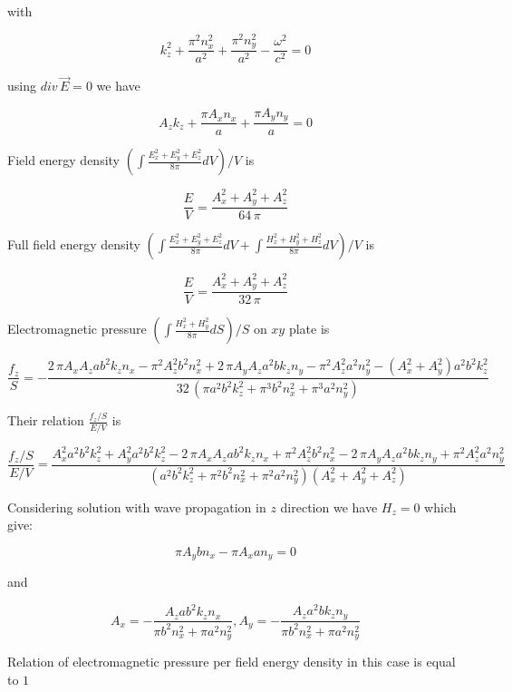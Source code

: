 \documentclass[11pt]{article}
\begin{document}
with

\[k_{z}^{2} + \frac{\pi^{2} n_{x}^{2}}{a^{2}} + \frac{\pi^{2} n_{y}^{2}}{a^{2}} - \frac{\omega^{2}}{c^{2}} = 0\]

using \(div\,\vec{E} = 0\) we have

\[A_{z} k_{z} + \frac{\pi A_{x} n_{x}}{a} + \frac{\pi A_{y} n_{y}}{a} = 0\]

Field energy density
\(\left(\int \frac{E_x^2+E_y^2+E_z^2}{8 \pi}dV\right)\big/{V}\) is

\[\frac{E}{V} = \frac{{A_{x}^{2} + A_{y}^{2} + A_{z}^{2}} }{64 \, \pi}\]

    Full field energy density
\(\left(\int \frac{E_x^2+E_y^2+E_z^2}{8 \pi}dV + \int \frac{H_x^2+H_y^2+H_z^2}{8 \pi}dV\right)\big/{V}\)
is

    \[\frac{E}{V} = \frac{{A_{x}^{2} + A_{y}^{2} + A_{z}^{2}}}{32 \, \pi}\]

    Electromagnetic pressure
\(\left({\int \frac {H_x^2+H_y^2}{8 \pi} dS}\right)\big/{S}\) on \(xy\)
plate is

    \[\frac{f_z}{S} = -\frac{2 \, \pi A_{x} A_{z} a b^{2} k_{z} n_{x} - \pi^{2} A_{z}^{2} b^{2} n_{x}^{2} + 2 \, \pi A_{y} A_{z} a^{2} b k_{z} n_{y} - \pi^{2} A_{z}^{2} a^{2} n_{y}^{2} - {\left(A_{x}^{2} + A_{y}^{2}\right)} a^{2} b^{2} k_{z}^{2}}{32 \, {\left(\pi a^{2} b^{2} k_{z}^{2} + \pi^{3} b^{2} n_{x}^{2} + \pi^{3} a^{2} n_{y}^{2}\right)}}\]

    Their relation \(\frac{f_z/S}{E/V}\) is

    \[\frac{f_z/S}{E/V} = \frac{A_{x}^{2} a^{2} b^{2} k_{z}^{2} + A_{y}^{2} a^{2} b^{2} k_{z}^{2} - 2 \, \pi A_{x} A_{z} a b^{2} k_{z} n_{x} + \pi^{2} A_{z}^{2} b^{2} n_{x}^{2} - 2 \, \pi A_{y} A_{z} a^{2} b k_{z} n_{y} + \pi^{2} A_{z}^{2} a^{2} n_{y}^{2}}{{\left(a^{2} b^{2} k_{z}^{2} + \pi^{2} b^{2} n_{x}^{2} + \pi^{2} a^{2} n_{y}^{2}\right)} {\left(A_{x}^{2} + A_{y}^{2} + A_{z}^{2}\right)}}\]

    Considering solution with wave propagation in \(z\) direction we have
\(H_z = 0\) which give:

    \[\pi A_{y} b n_{x} - \pi A_{x} a n_{y} = 0\]

    and

\[A_{x} = -\frac{A_{z} a b^{2} k_{z} n_{x}}{\pi b^{2} n_{x}^{2} + \pi a^{2} n_{y}^{2}},
A_{y} = -\frac{A_{z} a^{2} b k_{z} n_{y}}{\pi b^{2} n_{x}^{2} + \pi a^{2} n_{y}^{2}}\]

    Relation of electromagnetic pressure per field energy density in this
case is equal to \(1\)
\end{document}
